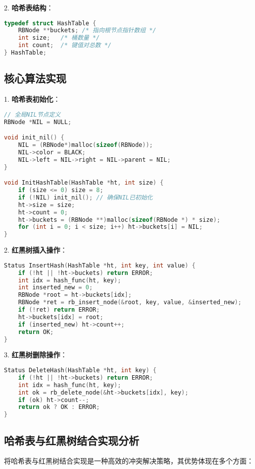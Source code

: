 \documentclass[12pt,a4paper]{article}
\begin{document}
2. \textbf{哈希表结构}：
\begin{lstlisting}[language=C,caption=哈希表结构]
typedef struct HashTable {
    RBNode **buckets; /* 指向根节点指针数组 */
    int size;   /* 桶数量 */
    int count;  /* 键值对总数 */
} HashTable;
\end{lstlisting}

\subsection{核心算法实现}
1. \textbf{哈希表初始化}：
\begin{lstlisting}[language=C,caption=哈希表初始化]
// 全局NIL节点定义
RBNode *NIL = NULL;

void init_nil() {
    NIL = (RBNode*)malloc(sizeof(RBNode));
    NIL->color = BLACK;
    NIL->left = NIL->right = NIL->parent = NIL;
}

void InitHashTable(HashTable *ht, int size) {
    if (size <= 0) size = 8;
    if (!NIL) init_nil(); // 确保NIL已初始化
    ht->size = size;
    ht->count = 0;
    ht->buckets = (RBNode **)malloc(sizeof(RBNode *) * size);
    for (int i = 0; i < size; i++) ht->buckets[i] = NIL;
}
\end{lstlisting}

2. \textbf{红黑树插入操作}：
\begin{lstlisting}[language=C,caption=红黑树插入操作]
Status InsertHash(HashTable *ht, int key, int value) {
    if (!ht || !ht->buckets) return ERROR;
    int idx = hash_func(ht, key);
    int inserted_new = 0;
    RBNode *root = ht->buckets[idx];
    RBNode *ret = rb_insert_node(&root, key, value, &inserted_new);
    if (!ret) return ERROR;
    ht->buckets[idx] = root;
    if (inserted_new) ht->count++;
    return OK;
}
\end{lstlisting}

3. \textbf{红黑树删除操作}：
\begin{lstlisting}[language=C,caption=红黑树删除操作]
Status DeleteHash(HashTable *ht, int key) {
    if (!ht || !ht->buckets) return ERROR;
    int idx = hash_func(ht, key);
    int ok = rb_delete_node(&ht->buckets[idx], key);
    if (ok) ht->count--;
    return ok ? OK : ERROR;
}
\end{lstlisting}

\subsection{哈希表与红黑树结合实现分析}
将哈希表与红黑树结合实现是一种高效的冲突解决策略，其优势体现在多个方面：
\end{document}
